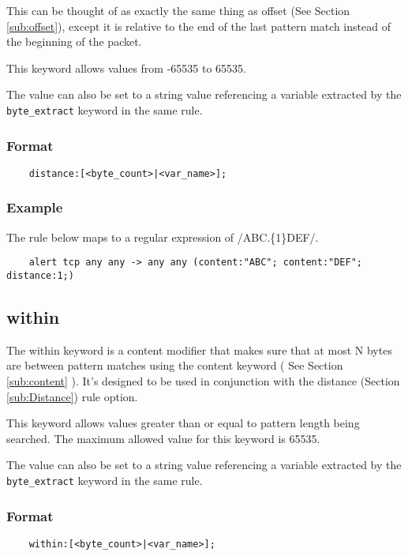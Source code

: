 \documentclass[english]{report}
\begin{document}
This can be thought of as exactly the same thing as offset (See Section
\ref{sub:offset}), except it is relative to the end of the last pattern match
instead of the beginning of the packet.

This keyword allows values from -65535 to 65535.

The value can also be set to a string value referencing a variable extracted by the
\texttt{byte\_extract} keyword in the same rule.

\subsubsection{Format}

\begin{verbatim}
    distance:[<byte_count>|<var_name>];
\end{verbatim}

\subsubsection{Example}

The rule below maps to a regular expression of /ABC.\{1\}DEF/.

\begin{verbatim}
    alert tcp any any -> any any (content:"ABC"; content:"DEF"; distance:1;)
\end{verbatim}

\subsection{within}
\label{sub:Within}

The within keyword is a content modifier that makes sure that at most N bytes
are between pattern matches using the content keyword ( See Section
\ref{sub:content} ).  It's designed to be used in conjunction with the distance
(Section \ref{sub:Distance}) rule option.

This keyword allows values greater than or equal to pattern length being searched. 
The maximum allowed value for this keyword is 65535.

The value can also be set to a string value referencing a variable extracted by the
\texttt{byte\_extract} keyword in the same rule.

\subsubsection{Format}

\begin{verbatim}
    within:[<byte_count>|<var_name>];
\end{verbatim}
\end{document}
